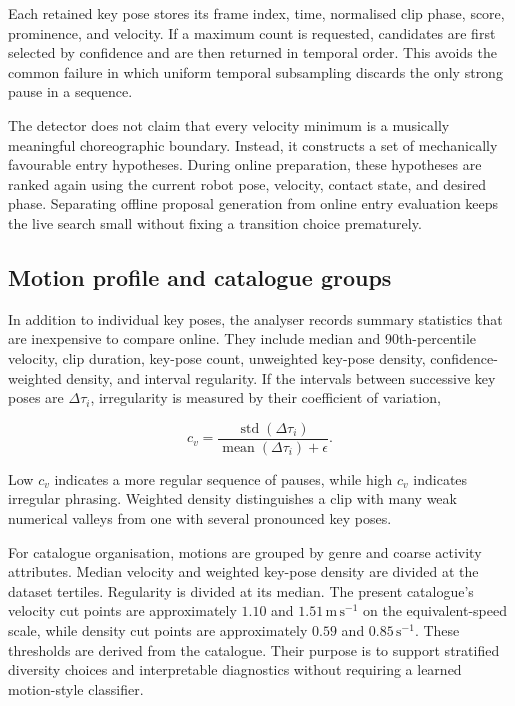 Each retained key pose stores its frame index, time, normalised clip phase,
score, prominence, and velocity. If a maximum count is requested, candidates
are first selected by confidence and are then returned in temporal order. This
avoids the common failure in which uniform temporal subsampling discards the
only strong pause in a sequence.

The detector does not claim that every velocity minimum is a musically
meaningful choreographic boundary. Instead, it constructs a set of mechanically
favourable entry hypotheses. During online preparation, these hypotheses are
ranked again using the current robot pose, velocity, contact state, and desired
phase. Separating offline proposal generation from online entry evaluation
keeps the live search small without fixing a transition choice prematurely.

\subsection{Motion profile and catalogue groups}
\label{subsec:motion_profile}

In addition to individual key poses, the analyser records summary statistics
that are inexpensive to compare online. They include median and 90th-percentile
velocity, clip duration, key-pose count, unweighted key-pose density, confidence-
weighted density, and interval regularity. If the intervals between successive
key poses are $\Delta\tau_i$, irregularity is measured by their coefficient of
variation,

\begin{equation}
    c_v=\frac{\operatorname{std}(\Delta\tau_i)}
              {\operatorname{mean}(\Delta\tau_i)+\epsilon}.
    \label{eq:keypose_interval_cv}
\end{equation}

Low $c_v$ indicates a more regular sequence of pauses, while high $c_v$
indicates irregular phrasing. Weighted density distinguishes a clip with many
weak numerical valleys from one with several pronounced key poses.

For catalogue organisation, motions are grouped by genre and coarse activity
attributes. Median velocity and weighted key-pose density are divided at the
dataset tertiles. Regularity is divided at its median. The present catalogue's
velocity cut points are approximately $1.10$ and $1.51\,\mathrm{m\,s^{-1}}$ on
the equivalent-speed scale, while density cut points are approximately $0.59$
and $0.85\,\mathrm{s^{-1}}$. These thresholds are derived from the catalogue.
Their purpose is to support
stratified diversity choices and interpretable diagnostics without requiring a
learned motion-style classifier.

